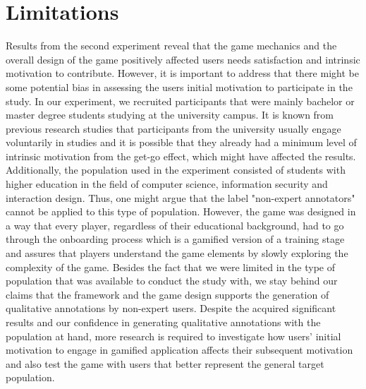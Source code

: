 \section{Limitations}
Results from the second experiment reveal that the game mechanics and the overall design of the game positively affected users needs satisfaction and intrinsic motivation to contribute. However, it is important to address that there might be some potential bias in assessing the users initial motivation to participate in the study. In our experiment, we recruited participants that were mainly bachelor or master degree students studying at the university campus. It is known from previous research studies that participants from the university usually engage voluntarily in studies and it is possible that they already had a minimum level of intrinsic motivation from the get-go effect, which might have affected the results. Additionally, the population used in the experiment consisted of students with higher education in the field of computer science, information security and interaction design. Thus, one might argue that the label "non-expert annotators" cannot be applied to this type of population. However, the game was designed in a way that every player, regardless of their educational background, had to go through the onboarding process which is a gamified version of a training stage and assures that players understand the game elements by slowly exploring the complexity of the game. Besides the fact that we were limited in the type of population that was available to conduct the study with, we stay behind our claims that the framework and the game design supports the generation of qualitative annotations by non-expert users. Despite the acquired significant results and our confidence in generating qualitative annotations with the population at hand, more research is required to investigate how users' initial motivation to engage in gamified application affects their subsequent motivation and also test the game with users that better represent the general target population\cite{46}.

